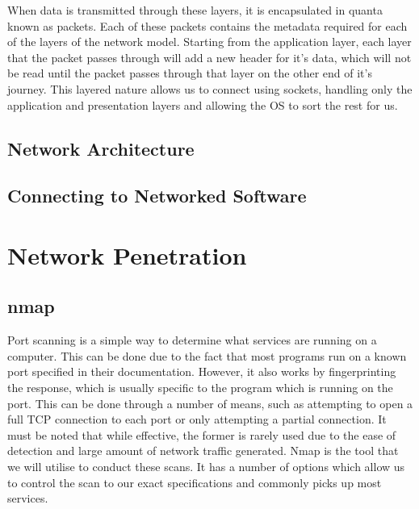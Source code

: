 \documentclass[a4paper,11pt]{report}
\begin{document}
		When data is transmitted through these layers, it is encapsulated in quanta known as packets. 
		Each of these packets contains the metadata required for each of the layers of the network model. 
		Starting from the application layer, each layer that the packet passes through will add a new header for it's data, which will not be read until the packet passes through that layer on the other end of it's journey. 
		This layered nature allows us to connect using sockets, handling only the application and presentation layers and allowing the OS to sort the rest for us. 
	\section{Network Architecture}
	\section{Connecting to Networked Software}
	
\chapter{Network Penetration}
	\label{ch:NetworkPenetration}
	\section{nmap}
		Port scanning is a simple way to determine what services are running on a computer. 
		This can be done due to the fact that most programs run on a known port specified in their documentation. 
		However, it also works by fingerprinting the response, which is usually specific to the program which is running on the port. 
		This can be done through a number of means, such as attempting to open a full TCP connection to each port or only attempting a partial connection. 
		It must be noted that while effective, the former is rarely used due to the ease of detection and large amount of network traffic generated. 
		Nmap\cite{NmapBook} is the tool that we will utilise to conduct these scans. 
		It has a number of options which allow us to control the scan to our exact specifications and commonly picks up most services.\cite{HackingAOE} 
\end{document}
